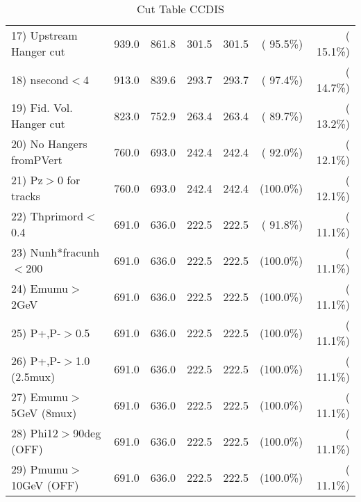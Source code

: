 \begin{table}[h!]
\begin{tabular}{||l||r|r|r|r|r|r||}
 17) Upstream Hanger cut  &        939.0 &        861.8 &        301.5 &        301.5 & ( 95.5\%) & ( 15.1\%) \\
 18) nsecond$<$4          &        913.0 &        839.6 &        293.7 &        293.7 & ( 97.4\%) & ( 14.7\%) \\
 19) Fid. Vol. Hanger cut &        823.0 &        752.9 &        263.4 &        263.4 & ( 89.7\%) & ( 13.2\%) \\
 20) No Hangers fromPVert &        760.0 &        693.0 &        242.4 &        242.4 & ( 92.0\%) & ( 12.1\%) \\
 21) Pz$>$0 for tracks    &        760.0 &        693.0 &        242.4 &        242.4 & (100.0\%) & ( 12.1\%) \\
 22) Thprimord$<$0.4      &        691.0 &        636.0 &        222.5 &        222.5 & ( 91.8\%) & ( 11.1\%) \\
 23) Nunh*fracunh$<$200   &        691.0 &        636.0 &        222.5 &        222.5 & (100.0\%) & ( 11.1\%) \\
 24) Emumu$>$2GeV         &        691.0 &        636.0 &        222.5 &        222.5 & (100.0\%) & ( 11.1\%) \\
 25) P+,P-$>$0.5          &        691.0 &        636.0 &        222.5 &        222.5 & (100.0\%) & ( 11.1\%) \\
 26) P+,P-$>$1.0 (2.5mux) &        691.0 &        636.0 &        222.5 &        222.5 & (100.0\%) & ( 11.1\%) \\
 27) Emumu$>$5GeV  (8mux) &        691.0 &        636.0 &        222.5 &        222.5 & (100.0\%) & ( 11.1\%) \\
 28) Phi12$>$90deg  (OFF) &        691.0 &        636.0 &        222.5 &        222.5 & (100.0\%) & ( 11.1\%) \\
 29) Pmumu$>$10GeV  (OFF) &        691.0 &        636.0 &        222.5 &        222.5 & (100.0\%) & ( 11.1\%) \\
 \hline
 \hline
 \end{tabular}
 \caption{Cut Table  CCDIS    }
 \label{tab-cutcohjpsi-mumu_ccdis}
 \end{table}
